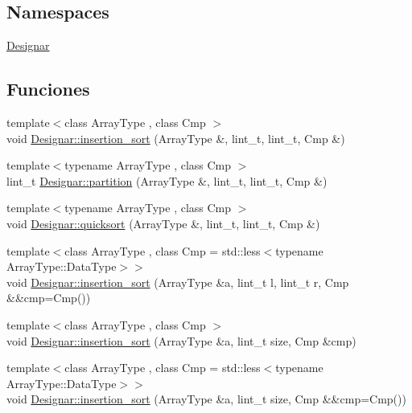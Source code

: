 \subsection*{Namespaces}
\begin{DoxyCompactItemize}
\item 
 \hyperlink{namespace_designar}{Designar}
\end{DoxyCompactItemize}
\subsection*{Funciones}
\begin{DoxyCompactItemize}
\item 
{\footnotesize template$<$class Array\+Type , class Cmp $>$ }\\void \hyperlink{namespace_designar_a9fec85a7dda46bb4840bf066c8483853}{Designar\+::insertion\+\_\+sort} (Array\+Type \&, lint\+\_\+t, lint\+\_\+t, Cmp \&)
\item 
{\footnotesize template$<$typename Array\+Type , class Cmp $>$ }\\lint\+\_\+t \hyperlink{namespace_designar_a43b31dd9df26bd0c268d2aa653de6cf0}{Designar\+::partition} (Array\+Type \&, lint\+\_\+t, lint\+\_\+t, Cmp \&)
\item 
{\footnotesize template$<$typename Array\+Type , class Cmp $>$ }\\void \hyperlink{namespace_designar_a2e26fd2dcbb26e5ffc96a960dd4caa94}{Designar\+::quicksort} (Array\+Type \&, lint\+\_\+t, lint\+\_\+t, Cmp \&)
\item 
{\footnotesize template$<$class Array\+Type , class Cmp  = std\+::less$<$typename Array\+Type\+::\+Data\+Type$>$$>$ }\\void \hyperlink{namespace_designar_ab2f897d6db2113316fee5efcd50a459d}{Designar\+::insertion\+\_\+sort} (Array\+Type \&a, lint\+\_\+t l, lint\+\_\+t r, Cmp \&\&cmp=Cmp())
\item 
{\footnotesize template$<$class Array\+Type , class Cmp $>$ }\\void \hyperlink{namespace_designar_a54b704ec22eb8fe7136b1bda64daf3a7}{Designar\+::insertion\+\_\+sort} (Array\+Type \&a, lint\+\_\+t size, Cmp \&cmp)
\item 
{\footnotesize template$<$class Array\+Type , class Cmp  = std\+::less$<$typename Array\+Type\+::\+Data\+Type$>$$>$ }\\void \hyperlink{namespace_designar_a8655d6fa8772dee92565bf7475e5612d}{Designar\+::insertion\+\_\+sort} (Array\+Type \&a, lint\+\_\+t size, Cmp \&\&cmp=Cmp())

\end{DoxyCompactItemize}
